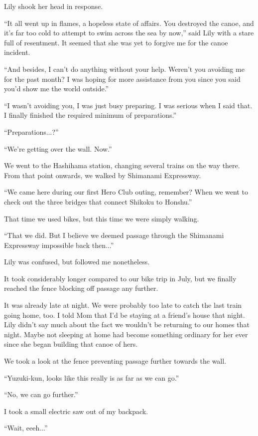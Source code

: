Lily shook her head in response.

``It all went up in flames, a hopeless state of affairs. You destroyed the canoe, and it's far too cold to attempt to swim across the sea by now,'' said Lily with a stare full of resentment. It seemed that she was yet to forgive me for the canoe incident.

``And besides, I can't do anything without your help. Weren't you avoiding me for the past month? I was hoping for more assistance from you since you said you'd show me the world outside.''

``I wasn't avoiding you, I was just busy preparing. I was serious when I said that. I finally finished the required minimum of preparations.''

``Preparations...?''

``We're getting over the wall. Now.''

We went to the Hashihama station, changing several trains on the way there. From that point onwards, we walked by Shimanami Expressway.

``We came here during our first Hero Club outing, remember? When we went to check out the three bridges that connect Shikoku to Honshu.''

That time we used bikes, but this time we were simply walking.

``That we did. But I believe we deemed passage through the Shimanami Expressway impossible back then...''

Lily was confused, but followed me nonetheless.

It took considerably longer compared to our bike trip in July, but we finally reached the fence blocking off passage any further.

It was already late at night. We were probably too late to catch the last train going home, too. I told Mom that I'd be staying at a friend's house that night. Lily didn't say much about the fact we wouldn't be returning to our homes that night. Maybe not sleeping at home had become something ordinary for her ever since she began building that canoe of hers.

We took a look at the fence preventing passage further towards the wall.

``Yuzuki-kun, looks like this really is as far as we can go.''

``No, we can go further.''

I took a small electric saw out of my backpack.

``Wait, eeeh...''

